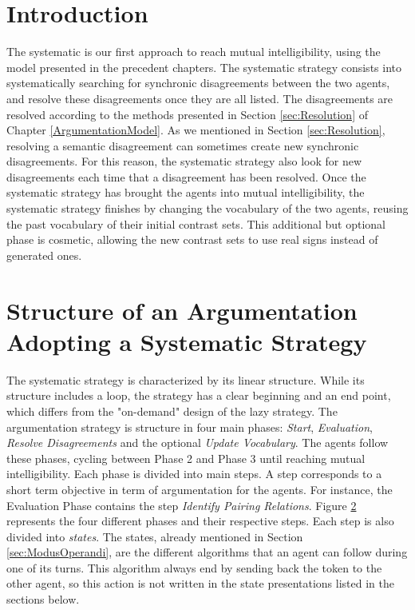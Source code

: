 \section{Introduction}

The systematic is our first approach to reach mutual intelligibility, using the model presented in the precedent chapters. The systematic strategy consists into systematically searching for synchronic disagreements between the two agents, and resolve these disagreements once they are all listed. The disagreements are resolved according to the methods presented in Section \ref{sec:Resolution} of Chapter \ref{ArgumentationModel}.
As we mentioned in Section \ref{sec:Resolution}, resolving a semantic disagreement can sometimes create new synchronic disagreements. For this reason, the systematic strategy also look for new disagreements each time that a disagreement has been resolved.
Once the systematic strategy has brought the agents into mutual intelligibility, the systematic strategy finishes by changing the vocabulary of the two agents, reusing the past vocabulary of their initial contrast sets. This additional but optional phase is cosmetic, allowing the new contrast sets to use real signs instead of generated ones.

\section{Structure of an Argumentation Adopting a Systematic Strategy}

The systematic strategy is characterized by its linear structure. While its structure includes a loop, the strategy has a clear beginning and an end point, which differs from the "on-demand" design of the lazy strategy. The argumentation strategy is structure in four main phases: \emph{Start}, \emph{Evaluation}, \emph{Resolve Disagreements} and the optional \emph{Update Vocabulary}. The agents follow these phases, cycling between Phase 2 and Phase 3 until reaching mutual intelligibility.  Each phase is divided into main steps. A step corresponds to a short term objective in term of argumentation for the agents. For instance, the Evaluation Phase contains the step \emph{Identify Pairing Relations}. Figure \ref{} represents the four different phases and their respective steps. Each step is also divided into \emph{states}. The states, already mentioned in Section \ref{sec:ModusOperandi}, are the different algorithms that an agent can follow during one of its turns. This algorithm always end by sending back the token to the other agent, so this action is not written in the state presentations listed in the sections below.

